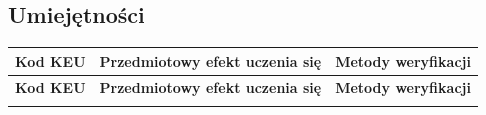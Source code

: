 \documentclass[12pt, a4paper]{article}
\newcommand{\thdrule}{\noalign{\global\setlength{\extrarowheight}{0pt}}}
\newcommand{\thdend}{\noalign{\global\setlength{\extrarowheight}{3pt}}}
\begin{document}
\subsection*{Umiejętności}
{\scriptsize
\begin{longtable}{m{1.6cm}m{9.0cm}m{4.2cm}}
\thdrule\toprule
\rowcolor{pjatkRed} {\color{white}\footnotesize\textbf{\vphantom{Ag}Kod KEU}} & {\color{white}\footnotesize\textbf{\vphantom{Ag}Przedmiotowy efekt uczenia się}} & {\color{white}\footnotesize\textbf{\vphantom{Ag}Metody weryfikacji}} \\
\midrule\thdend
\endfirsthead
\thdrule\toprule
\rowcolor{pjatkRed} {\color{white}\footnotesize\textbf{\vphantom{Ag}Kod KEU}} & {\color{white}\footnotesize\textbf{\vphantom{Ag}Przedmiotowy efekt uczenia się}} & {\color{white}\footnotesize\textbf{\vphantom{Ag}Metody weryfikacji}} \\
\midrule\thdend
\endhead

\end{longtable}}
\end{document}

